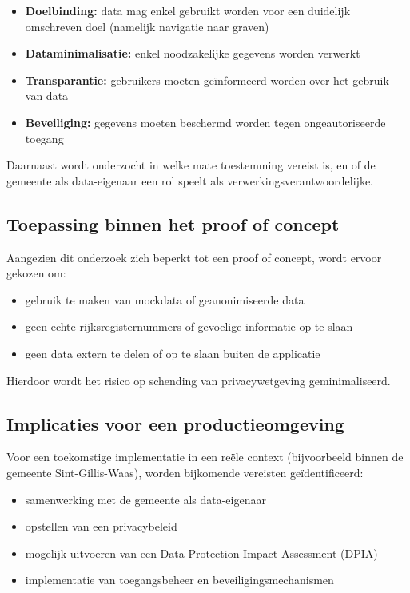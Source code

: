 \begin{itemize}
    \item \textbf{Doelbinding:} data mag enkel gebruikt worden voor een duidelijk omschreven doel (namelijk navigatie naar graven)
    \item \textbf{Dataminimalisatie:} enkel noodzakelijke gegevens worden verwerkt
    \item \textbf{Transparantie:} gebruikers moeten geïnformeerd worden over het gebruik van data
    \item \textbf{Beveiliging:} gegevens moeten beschermd worden tegen ongeautoriseerde toegang
\end{itemize}

Daarnaast wordt onderzocht in welke mate toestemming vereist is, en of de gemeente als data-eigenaar een rol speelt als verwerkingsverantwoordelijke.

\subsection{Toepassing binnen het proof of concept}

Aangezien dit onderzoek zich beperkt tot een proof of concept, wordt ervoor gekozen om:
\begin{itemize}
    \item gebruik te maken van mockdata of geanonimiseerde data
    \item geen echte rijksregisternummers of gevoelige informatie op te slaan
    \item geen data extern te delen of op te slaan buiten de applicatie
\end{itemize}

Hierdoor wordt het risico op schending van privacywetgeving geminimaliseerd.

\subsection{Implicaties voor een productieomgeving}

Voor een toekomstige implementatie in een reële context (bijvoorbeeld binnen de gemeente Sint-Gillis-Waas), worden bijkomende vereisten geïdentificeerd:

\begin{itemize}
    \item samenwerking met de gemeente als data-eigenaar
    \item opstellen van een privacybeleid
    \item mogelijk uitvoeren van een Data Protection Impact Assessment (DPIA)
    \item implementatie van toegangsbeheer en beveiligingsmechanismen
\end{itemize}

